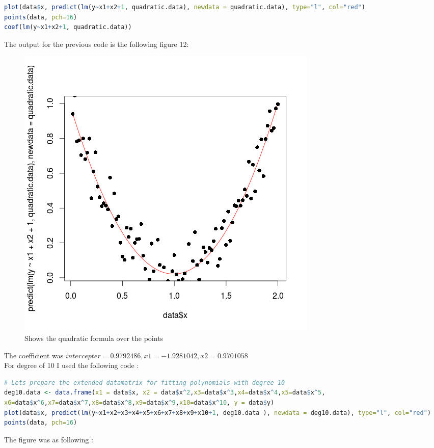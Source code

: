 \documentclass{article}
\begin{document}
\begin{multicols*}{2}
\begin{flushleft}
\begin{flushleft}
\begin{lstlisting}[language=R]
plot(data$x, predict(lm(y~x1+x2+1, quadratic.data), newdata = quadratic.data), type="l", col="red")
points(data, pch=16)
coef(lm(y~x1+x2+1, quadratic.data))
\end{lstlisting}
The output for the previous code is the following figure 12:
\begin{figure}[H]
\begin{center}
\includegraphics[scale=0.4]{plotquaratic.png}
\end{center}
\caption{Shows the quadratic formula over the points}
\end{figure}
The coefficient was \(intercepter = 0.9792486 ,x1=-1.9281042,x2 =0.9701058\) \\
For degree of 10 I used the following code : 
\begin{lstlisting}[language=R]
# Lets prepare the extended datamatrix for fitting polynomials with degree 10
deg10.data <- data.frame(x1 = data$x, x2 = data$x^2,x3=data$x^3,x4=data$x^4,x5=data$x^5,
x6=data$x^6,x7=data$x^7,x8=data$x^8,x9=data$x^9,x10=data$x^10, y = data$y)
plot(data$x, predict(lm(y~x1+x2+x3+x4+x5+x6+x7+x8+x9+x10+1, deg10.data ), newdata = deg10.data), type="l", col="red")
points(data, pch=16)
\end{lstlisting}
The figure was as following : 
\begin{figure}[H]
\begin{center}

\end{center}
\end{figure}
\end{flushleft}
\end{flushleft}
\end{multicols*}
\end{document}
